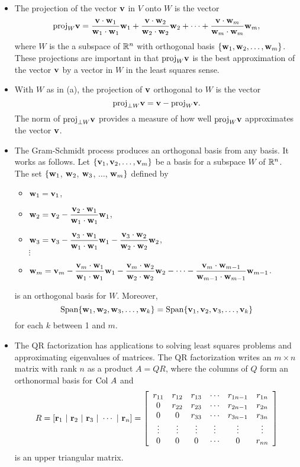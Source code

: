 \begin{itemize}
\item The projection of the vector $\mathbf{v}$ in $V$ onto $W$ is the vector
\[\text{proj}_W \mathbf{v} = \frac{\mathbf{v} \cdot \mathbf{w}_1}{\mathbf{w}_1 \cdot \mathbf{w}_1} \mathbf{w}_1 + \frac{\mathbf{v} \cdot \mathbf{w}_2}{\mathbf{w}_2 \cdot \mathbf{w}_2}  \mathbf{w}_2 + \cdots + \frac{\mathbf{v} \cdot \mathbf{w}_m}{\mathbf{w}_m \cdot \mathbf{w}_m}  \mathbf{w}_m,\]
where $W$ is the a subspace of $\mathbb{R}^n$ with orthogonal basis $\{\mathbf{w}_1, \mathbf{w}_2, \ldots, \mathbf{w}_m\}$. These projections are important in that $\text{proj}_W \mathbf{v}$ is the best approximation of the vector $\mathbf{v}$ by a vector in $W$ in the least squares sense.  
\item With $W$ as in (a), the projection of $\mathbf{v}$ orthogonal to $W$ is the vector
\[\text{proj}_{\perp W} \mathbf{v} = \mathbf{v} - \text{proj}_W \mathbf{v}.\]
The norm of $\text{proj}_{\perp W} \mathbf{v}$ provides a measure of how well $\text{proj}_W \mathbf{v}$ approximates the vector $\mathbf{v}$. 
\item The Gram-Schmidt process produces an orthogonal basis from any basis. It works as follows. Let $\{\mathbf{v}_1, \mathbf{v}_2, \ldots, \mathbf{v}_m\}$ be a basis for a subspace $W$ of $\mathbb{R}^n$. The set $\{\mathbf{w}_1$, $\mathbf{w}_2$, $\mathbf{w}_3$, $\ldots$, $\mathbf{w}_{m}\}$ defined by
\begin{itemize}
\item $\mathbf{w}_1 = \mathbf{v}_1$,
\item $\mathbf{w}_2 = \mathbf{v}_2 - \displaystyle \frac{\mathbf{v}_2 \cdot \mathbf{w}_1}{\mathbf{w}_1 \cdot \mathbf{w}_1} \mathbf{w}_1$,
\item $\mathbf{w}_3 =  \mathbf{v}_3 - \displaystyle \frac{ \mathbf{v}_3 \cdot  \mathbf{w}_1 }{ \mathbf{w}_1 \cdot  \mathbf{w}_1 } \mathbf{w}_1 - \frac{ \mathbf{v}_3 \cdot  \mathbf{w}_2 }{ \mathbf{w}_2 \cdot  \mathbf{w}_2 } \mathbf{w}_2$, \\
\qquad $\vdots$
\item $\mathbf{w}_m = \mathbf{v}_m - \displaystyle \frac{ \mathbf{v}_m \cdot  \mathbf{w}_1 }{ \mathbf{w}_1 \cdot  \mathbf{w}_1 } \mathbf{w}_1 - \frac{ \mathbf{v}_m \cdot  \mathbf{w}_2 }{ \mathbf{w}_2 \cdot  \mathbf{w}_2 } \mathbf{w}_2 - \cdots - \frac{ \mathbf{v}_m \cdot \mathbf{w}_{m-1} }{ \mathbf{w}_{m-1} \cdot  \mathbf{w}_{m-1} } \mathbf{w}_{m-1}$.
\end{itemize}
is an orthogonal basis for $W$. Moreover,
\[\text{Span}\{\mathbf{w}_1, \mathbf{w}_2, \mathbf{w}_3, \ldots, \mathbf{w}_{k}\} = \text{Span}\{\mathbf{v}_1,\mathbf{v}_2,\mathbf{v}_3, \ldots, \mathbf{v}_{k}\}\]
for each $k$ between 1 and $m$.
\item The QR factorization has applications to solving least squares problems and approximating eigenvalues of matrices. The QR factorization writes an $m \times n$ matrix with rank $n$ as a product $A = QR$, where the columns of $Q$ form an orthonormal basis for $\text{Col } A$ and
\[R = [\mathbf{r}_1 \ | \ \mathbf{r}_2 \ | \ \mathbf{r}_3 \ | \ \cdots \ | \ \mathbf{r}_n ] = \left[ \begin{array}{cccccc} r_{11}&r_{12}&r_{13}& \cdots &r_{1n-1}&r_{1n} \\ 0&r_{22}&r_{23}& \cdots &r_{2n-1}&r_{2n} \\ 0&0&r_{33}& \cdots &r_{3n-1}&r_{3n} \\ \vdots&\vdots &\vdots &\vdots &\vdots &\vdots \\ 0&0&0& \cdots &0&r_{nn} \end{array} \right]\]
is an upper triangular matrix. 
\end{itemize}




